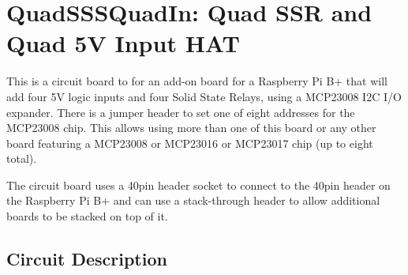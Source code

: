 %
%
%
%
% 
%
%
%
%
%
% 
%

\chapter{QuadSSSQuadIn: Quad SSR and Quad 5V Input HAT}

This is a circuit board to for an add-on board for a Raspberry Pi B+ that will
add four 5V logic inputs and four Solid State Relays, using a MCP23008 I2C I/O 
expander.  There is a jumper header to set one of eight addresses for the 
MCP23008 chip.  This allows using more than one of this board or any other 
board featuring a MCP23008 or MCP23016 or MCP23017 chip (up to eight total).

The circuit board uses a 40pin header socket to connect to the 40pin header on
the  Raspberry Pi B+ and can use a  stack-through  header to allow  additional
boards to be stacked on top of it.

\section{Circuit Description}                                                  
 
